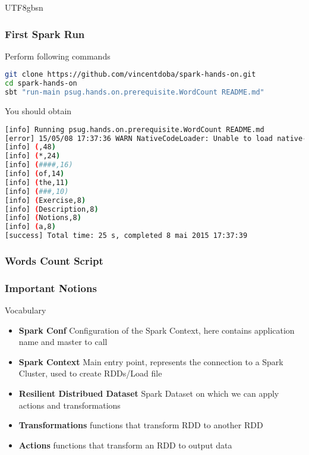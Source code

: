 \documentclass[slidetop,9pt,utf8]{beamer}
\begin{document}
\begin{CJK}{UTF8}{gbsn}
\begin{frame}[fragile]
  \frametitle{First Spark Run}

  \begin{block}{Perform following commands}
    \begin{lstlisting}[language=bash, style=terminal]
git clone https://github.com/vincentdoba/spark-hands-on.git
cd spark-hands-on
sbt "run-main psug.hands.on.prerequisite.WordCount README.md" 
    \end{lstlisting}
  \end{block}

  \begin{block}{You should obtain}
    \begin{lstlisting}[language=bash, style=terminal]
[info] Running psug.hands.on.prerequisite.WordCount README.md
[error] 15/05/08 17:37:36 WARN NativeCodeLoader: Unable to load native-hadoop library for your platform... using builtin-java classes where applicable
[info] (,48)
[info] (*,24)
[info] (####,16)
[info] (of,14)
[info] (the,11)
[info] (###,10)
[info] (Exercise,8)
[info] (Description,8)
[info] (Notions,8)
[info] (a,8)
[success] Total time: 25 s, completed 8 mai 2015 17:37:39
    \end{lstlisting}
  \end{block}

\end{frame}

\begin{frame}[fragile]
  \frametitle{Words Count Script}

  

\end{frame}

\begin{frame}
  \frametitle{Important Notions}

  \begin{block}{Vocabulary}
    \begin{itemize}
      \item \textbf{Spark Conf} Configuration of the Spark Context, here contains application name and master to call
      \item \textbf{Spark Context} Main entry point, represents the connection to a Spark Cluster, used to create RDDs/Load file
      \item \textbf{Resilient Distribued Dataset} Spark Dataset on which we can apply actions and transformations
      \item \textbf{Transformations} functions that transform RDD to another RDD
      \item \textbf{Actions} functions that transform an RDD to output data
    \end{itemize}
  \end{block}


\end{frame}
\end{CJK}
\end{document}
